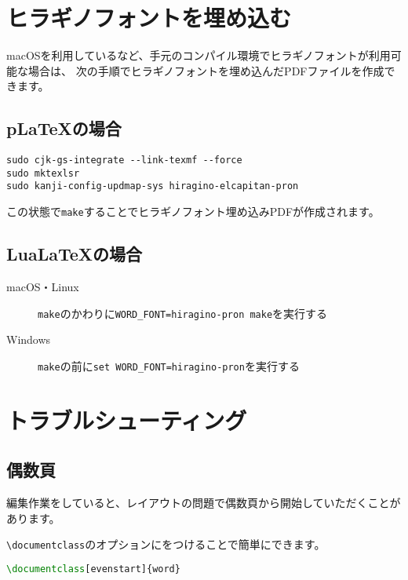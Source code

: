 \documentclass[../../main]{subfiles}
\begin{document}
\section{ヒラギノフォントを埋め込む}

macOSを利用しているなど、手元のコンパイル環境でヒラギノフォントが利用可能な場合は、
次の手順でヒラギノフォントを埋め込んだPDFファイルを作成できます。

\subsection{p\LaTeX の場合}

\begin{lstlisting}
sudo cjk-gs-integrate --link-texmf --force
sudo mktexlsr  
sudo kanji-config-updmap-sys hiragino-elcapitan-pron
\end{lstlisting}
  
この状態で\lstinline|make|することでヒラギノフォント埋め込みPDFが作成されます。

\subsection{Lua\LaTeX の場合}

\begin{description}
  \item[macOS・Linux] \lstinline|make|のかわりに\lstinline|WORD_FONT=hiragino-pron make|を実行する

  \item[Windows] \lstinline|make|の前に\lstinline|set WORD_FONT=hiragino-pron|を実行する
\end{description}

\section{トラブルシューティング}

\subsection{偶数頁}

編集作業をしていると、レイアウトの問題で偶数頁から開始していただくことがあります。

\lstinline|\documentclass|のオプションにをつけることで簡単にできます。

\begin{lstlisting}[language=TeX, mathescape]
\documentclass[evenstart]{word}
\end{lstlisting}
\end{document}
